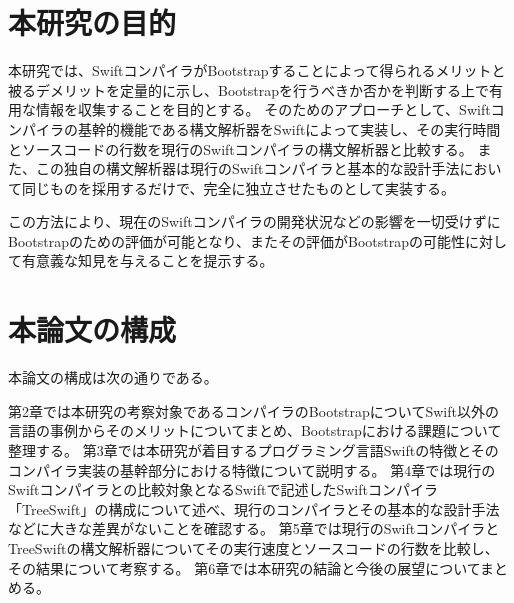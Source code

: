 \section{本研究の目的}
\label{introduction:purpose}

本研究では、SwiftコンパイラがBootstrapすることによって得られるメリットと被るデメリットを定量的に示し、Bootstrapを行うべきか否かを判断する上で有用な情報を収集することを目的とする。
そのためのアプローチとして、Swiftコンパイラの基幹的機能である構文解析器をSwiftによって実装し、その実行時間とソースコードの行数を現行のSwiftコンパイラの構文解析器と比較する。
また、この独自の構文解析器は現行のSwiftコンパイラと基本的な設計手法において同じものを採用するだけで、完全に独立させたものとして実装する。

この方法により、現在のSwiftコンパイラの開発状況などの影響を一切受けずにBootstrapのための評価が可能となり、またその評価がBootstrapの可能性に対して有意義な知見を与えることを提示する。


\section{本論文の構成}

本論文の構成は次の通りである。

第2章では本研究の考察対象であるコンパイラのBootstrapについてSwift以外の言語の事例からそのメリットについてまとめ、Bootstrapにおける課題について整理する。
第3章では本研究が着目するプログラミング言語Swiftの特徴とそのコンパイラ実装の基幹部分における特徴について説明する。
第4章では現行のSwiftコンパイラとの比較対象となるSwiftで記述したSwiftコンパイラ「TreeSwift」の構成について述べ、現行のコンパイラとその基本的な設計手法などに大きな差異がないことを確認する。
第5章では現行のSwiftコンパイラとTreeSwiftの構文解析器についてその実行速度とソースコードの行数を比較し、その結果について考察する。
第6章では本研究の結論と今後の展望についてまとめる。

